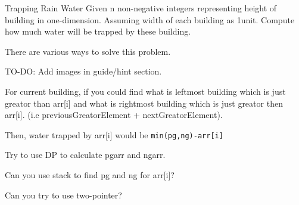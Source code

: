 \begin{problem}{Trapping Rain Water}
    Given n non-negative integers representing height of building in one-dimension. Assuming width of each building as 1unit. Compute how much water will be trapped by these building.

\end{problem}

\begin{solution}
    There are various ways to solve this problem.

    \begin{guide}

        TO-DO: Add images in guide/hint section.

        \item For current building, if you could find what is leftmost building which is just greator than arr[i] and what is rightmost building which is just greator then arr[i]. (i.e previousGreatorElement + nextGreatorElement).
        
        Then, water trapped by arr[i] would be \verb|min(pg,ng)-arr[i]|

        Try to use DP to calculate pgarr and ngarr.

        \item Can you use stack to find pg and ng for arr[i]?
        
        \item Can you try to use two-pointer?
    \end{guide}

\end{solution}

